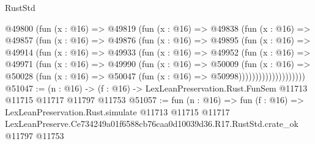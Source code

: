 \begin{lexlean}{RustStd}
\begin{coremodule}
              @49800
                (fun (x : @16) =>
                @49819
                  (fun (x : @16) =>
                  @49838
                    (fun (x : @16) =>
                    @49857
                      (fun (x : @16) =>
                      @49876
                        (fun (x : @16) =>
                        @49895
                          (fun (x : @16) =>
                          @49914
                            (fun (x : @16) =>
                            @49933
                              (fun (x : @16) =>
                              @49952
                                (fun (x : @16) =>
                                @49971
                                  (fun (x : @16) =>
                                  @49990
                                    (fun (x : @16) =>
                                    @50009
                                      (fun (x : @16) =>
                                      @50028
                                        (fun (x : @16) =>
                                        @50047 (fun (x : @16) => @50998))))))))))))))))))))
@51047 := (n : @16) ->
  (f : @16) -> LexLeanPreservation.Rust.FunSem @11713 @11715 @11717 @11797 @11753
@51057 := fun (n : @16) =>
  fun (f : @16) =>
  LexLeanPreservation.Rust.simulate
    @11713
    @11715
    @11717
    LexLeanPreserve.Ce734249a01f6588cb76caa0d10039d36.R17.RustStd.crate_ok
    @11797
    @11753
\end{coremodule}
\end{lexlean}
